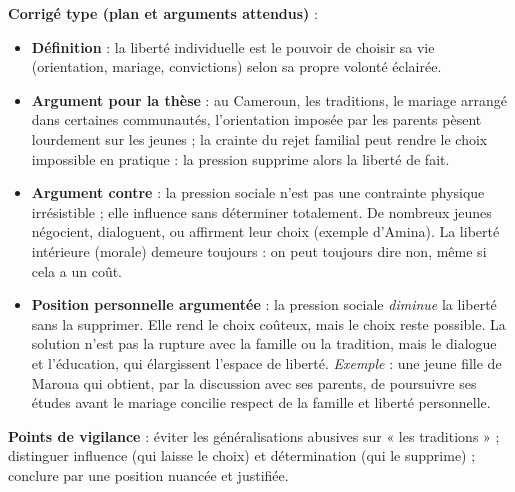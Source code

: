 \documentclass[11pt]{article}
\begin{document}
\begin{corrige}
\textbf{Corrigé type (plan et arguments attendus)} :
\begin{itemize}
\item \textbf{Définition} : la liberté individuelle est le pouvoir de choisir sa vie (orientation, mariage, convictions) selon sa propre volonté éclairée.
\item \textbf{Argument pour la thèse} : au Cameroun, les traditions, le mariage arrangé dans certaines communautés, l'orientation imposée par les parents pèsent lourdement sur les jeunes ; la crainte du rejet familial peut rendre le choix impossible en pratique : la pression supprime alors la liberté de fait.
\item \textbf{Argument contre} : la pression sociale n'est pas une contrainte physique irrésistible ; elle influence sans déterminer totalement. De nombreux jeunes négocient, dialoguent, ou affirment leur choix (exemple d'Amina). La liberté intérieure (morale) demeure toujours : on peut toujours dire non, même si cela a un coût.
\item \textbf{Position personnelle argumentée} : la pression sociale \emph{diminue} la liberté sans la supprimer. Elle rend le choix coûteux, mais le choix reste possible. La solution n'est pas la rupture avec la famille ou la tradition, mais le dialogue et l'éducation, qui élargissent l'espace de liberté. \emph{Exemple} : une jeune fille de Maroua qui obtient, par la discussion avec ses parents, de poursuivre ses études avant le mariage concilie respect de la famille et liberté personnelle.
\end{itemize}
\textbf{Points de vigilance} : éviter les généralisations abusives sur « les traditions » ; distinguer influence (qui laisse le choix) et détermination (qui le supprime) ; conclure par une position nuancée et justifiée.
\end{corrige}
\end{document}
